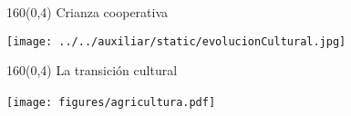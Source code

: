 \documentclass[shownotes,aspectratio=169]{beamer}
\begin{document}
% 
% 
% 

\begin{frame}[plain]
\begin{textblock}{160}(0,4)
 \centering \LARGE
Crianza cooperativa
\end{textblock}
\vspace{1cm}

\texttt{[image: ../../auxiliar/static/evolucionCultural.jpg]}

\end{frame}


\begin{frame}[plain]
\begin{textblock}{160}(0,4)
 \centering \LARGE
La transición cultural
\end{textblock}
\vspace{0.3cm}

\centering
\texttt{[image: figures/agricultura.pdf]} \ \ \ \ \ 

\end{frame}
\end{document}

